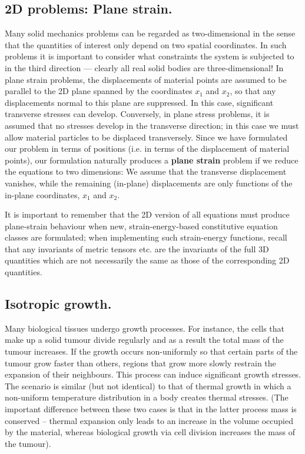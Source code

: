 \hypertarget{index_two_d_solid}{}\subsection{2\+D problems\+: Plane strain.}\label{index_two_d_solid}
Many solid mechanics problems can be regarded as two-\/dimensional in the sense that the quantities of interest only depend on two spatial coordinates. In such problems it is important to consider what constraints the system is subjected to in the third direction --- clearly all real solid bodies are three-\/dimensional! In plane strain problems, the displacements of material points are assumed to be parallel to the 2D plane spanned by the coordinates $x_1 $ and $ x_2$, so that any displacements normal to this plane are suppressed. In this case, significant transverse stresses can develop. Conversely, in plane stress problems, it is assumed that no stresses develop in the transverse direction; in this case we must allow material particles to be displaced transversely. Since we have formulated our problem in terms of positions (i.\+e. in terms of the displacement of material points), our formulation naturally produces a {\bfseries plane strain} problem if we reduce the equations to two dimensions\+: We assume that the transverse displacement vanishes, while the remaining (in-\/plane) displacements are only functions of the in-\/plane coordinates, $ x_1$ and $ x_2$.

It is important to remember that the 2D version of all equations must produce plane-\/strain behaviour when new, strain-\/energy-\/based constitutive equation classes are formulated; when implementing such strain-\/energy functions, recall that any invariants of metric tensors etc. are the invariants of the full 3D quantities which are not necessarily the same as those of the corresponding 2D quantities.



\hypertarget{index_isotropic_growth}{}\subsection{Isotropic growth.}\label{index_isotropic_growth}
Many biological tissues undergo growth processes. For instance, the cells that make up a solid tumour divide regularly and as a result the total mass of the tumour increases. If the growth occurs non-\/uniformly so that certain parts of the tumour grow faster than others, regions that grow more slowly restrain the expansion of their neighbours. This process can induce significant growth stresses. The scenario is similar (but not identical) to that of thermal growth in which a non-\/uniform temperature distribution in a body creates thermal stresses. (The important difference between these two cases is that in the latter process mass is conserved -- thermal expansion only leads to an increase in the volume occupied by the material, whereas biological growth via cell division increases the mass of the tumour).


